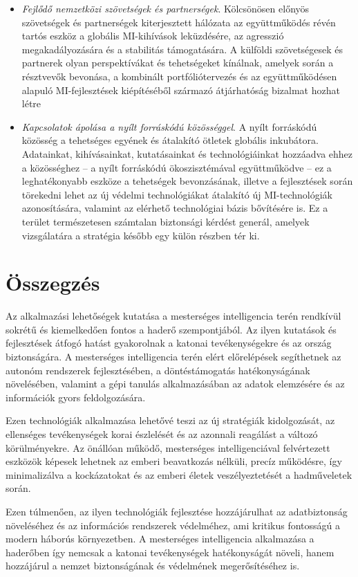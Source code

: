 \documentclass[
]{thesis-ekf}
\theoremstyle{definition}
\theoremstyle{remark}
\begin{document}
\begin{itemize}
	\item \emph{Fejlődő nemzetközi szövetségek és partnerségek}. Kölcsönösen előnyös szövetségek és partnerségek kiterjesztett hálózata az együttműködés révén tartós eszköz a globális MI-kihívások leküzdésére, az agresszió megakadályozására és a stabilitás támogatására. A külföldi szövetségesek és partnerek olyan perspektívákat és tehetségeket kínálnak, amelyek során a résztvevők bevonása, a kombinált portfóliótervezés és az együttműködésen alapuló MI-fejlesztések kiépítéséből származó átjárhatóság bizalmat hozhat létre
	\item \emph{Kapcsolatok ápolása a nyílt forráskódú közösséggel}. A nyílt forráskódú közösség  a tehetséges egyének és átalakító ötletek globális inkubátora. Adatainkat, kihívásainkat, kutatásainkat és technológiáinkat hozzáadva ehhez a közösséghez – a nyílt forráskódú ökoszisztémával együttműködve – ez a leghatékonyabb eszköze a tehetségek bevonzásának, illetve a fejlesztések során törekedni lehet az új védelmi technológiákat átalakító új MI-technológiák azonosítására, valamint az elérhető technológiai bázis bővítésére is. Ez a terület természetesen számtalan biztonsági kérdést generál, amelyek vizsgálatára a stratégia később egy külön részben tér ki.
\end{itemize}

\chapter*{Összegzés}
Az alkalmazási lehetőségek kutatása a mesterséges intelligencia terén rendkívül sokrétű és kiemelkedően fontos a haderő szempontjából. Az ilyen kutatások és fejlesztések átfogó hatást gyakorolnak a katonai tevékenységekre és az ország biztonságára. A mesterséges intelligencia terén elért előrelépések segíthetnek az autonóm rendszerek fejlesztésében, a döntéstámogatás hatékonyságának növelésében, valamint a gépi tanulás alkalmazásában az adatok elemzésére és az információk gyors feldolgozására.

Ezen technológiák alkalmazása lehetővé teszi az új stratégiák kidolgozását, az ellenséges tevékenységek korai észlelését és az azonnali reagálást a változó körülményekre. Az önállóan működő, mesterséges intelligenciával felvértezett eszközök képesek lehetnek az emberi beavatkozás nélküli, precíz működésre, így minimalizálva a kockázatokat és az emberi életek veszélyeztetését a hadműveletek során.

Ezen túlmenően, az ilyen technológiák fejlesztése hozzájárulhat az adatbiztonság növeléséhez és az információs rendszerek védelméhez, ami kritikus fontosságú a modern háborús környezetben. A mesterséges intelligencia alkalmazása a haderőben így nemcsak a katonai tevékenységek hatékonyságát növeli, hanem hozzájárul a nemzet biztonságának és védelmének megerősítéséhez is.
\end{document}
